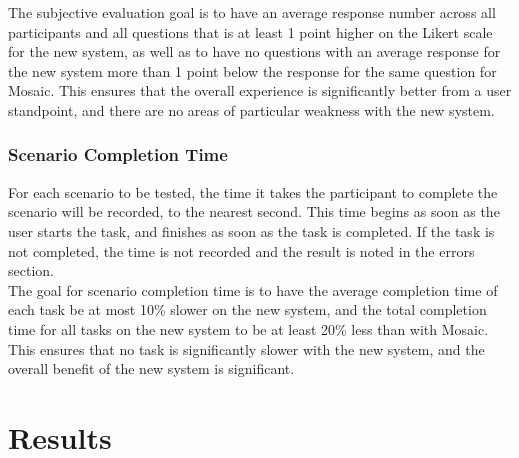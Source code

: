\documentclass[10pt]{article}
\begin{document}
\begin{multicols}{2}
The subjective evaluation goal is to have an average response number across all participants and all questions that is at least 1 point higher on the Likert scale for the new system, as well as to have no questions with an average response for the new system more than 1 point below the response for the same question for Mosaic. This ensures that the overall experience is significantly better from a user standpoint, and there are no areas of particular weakness with the new system.

\subsubsection*{Scenario Completion Time}
For each scenario to be tested, the time it takes the participant to complete the scenario will be recorded, to the nearest second. This time begins as soon as the user starts the task, and finishes as soon as the task is completed. If the task is not completed, the time is not recorded and the result is noted in the errors section.\\

The goal for scenario completion time is to have the average completion time of each task be at most 10\% slower on the new system, and the total completion time for all tasks on the new system to be at least 20\% less than with Mosaic. This ensures that no task is significantly slower with the new system, and the overall benefit of the new system is significant.

\section*{Results}

\end{multicols}
\end{document}
